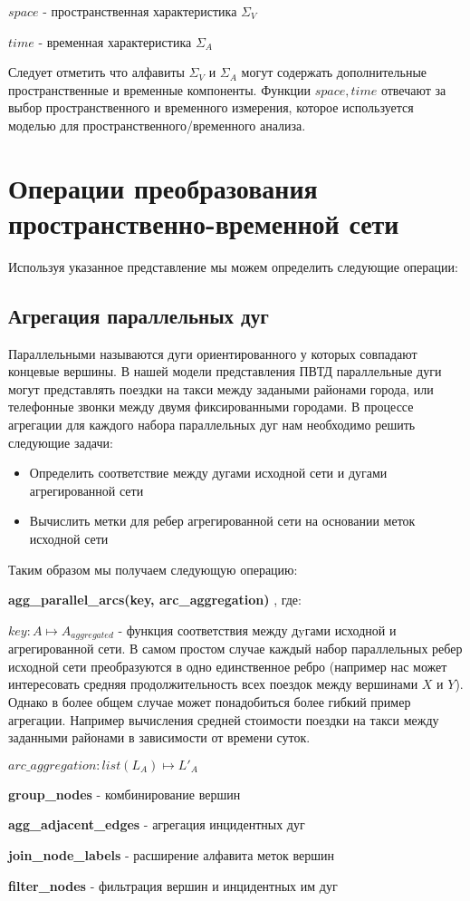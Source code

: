 $space$ - пространственная характеристика $\Sigma_V$

$time$ - временная характеристика $\Sigma_A$


Следует отметить что алфавиты $\Sigma_V$ и $\Sigma_A$ могут содержать дополнительные пространственные и временные компоненты. Функции $space, time$ отвечают за выбор пространственного и временного измерения, которое  используется моделью для пространственного/временного анализа.

\section*{Операции преобразования пространственно-временной сети}

Используя указанное представление мы можем определить следующие операции:

\subsection*{Агрегация параллельных дуг}

Параллельными называются дуги ориентированного у которых совпадают концевые вершины. В нашей модели представления ПВТД параллельные дуги могут представлять поездки на такси между задаными районами города, или телефонные звонки между двумя фиксированными городами. В процессе агрегации для каждого набора параллельных дуг нам необходимо решить следующие задачи:

\begin{itemize}
  \item Определить соответствие между дугами исходной сети и дугами агрегированной сети
  \item Вычислить метки для ребер агрегированной сети на основании меток исходной сети
\end{itemize}

Таким образом мы получаем следующую операцию:

\textbf{agg\_parallel\_arcs(key, arc\_aggregation)} , где:

$key: A \mapsto A_{aggregated}$ - функция соответствия между дyгами исходной и агрегированной сети. В самом простом случае каждый набор параллельных ребер исходной сети преобразуются в одно единственное ребро (например нас может интересовать средняя продолжительность всех поездок между вершинами $X$ и $Y$). Однако в более общем случае  может понадобиться более гибкий пример агрегации. Например вычисления средней стоимости поездки на такси между заданными районами в зависимости от времени суток.  

$arc\_aggregation: list(L_A) \mapsto L'_A$

\textbf{group\_nodes} - комбинирование вершин

\textbf{agg\_adjacent\_edges} - агрегация инцидентных дуг

\textbf{join\_node\_labels} - расширение алфавита меток вершин

\textbf{filter\_nodes} - фильтрация вершин и инцидентных им дуг

